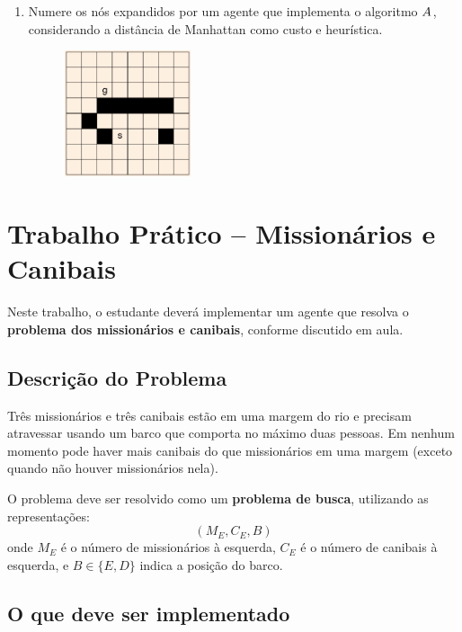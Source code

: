 \documentclass[9pt,a4paper]{extarticle}
\begin{document}
\begin{enumerate}
\begin{enumerate}[label*=\alph*)]
    \item Numere os nós expandidos por um agente que implementa o algoritmo \textbf{$A^{\*}$}, considerando a distância de Manhattan como custo e heurística.
    \begin{figure}[!ht]
      \centering
      \includegraphics[width=0.35\textwidth]{grid.png}
    \end{figure}
  \end{enumerate}

\end{enumerate}

\section{Trabalho Prático -- Missionários e Canibais}

Neste trabalho, o estudante deverá implementar um agente que resolva o \textbf{problema dos missionários e canibais}, conforme discutido em aula.

\subsection*{Descrição do Problema}

Três missionários e três canibais estão em uma margem do rio e precisam atravessar usando um barco que comporta no máximo duas pessoas.  
Em nenhum momento pode haver mais canibais do que missionários em uma margem (exceto quando não houver missionários nela).  

O problema deve ser resolvido como um \textbf{problema de busca}, utilizando as representações:
\[
(M_E, C_E, B)
\]
onde $M_E$ é o número de missionários à esquerda, $C_E$ é o número de canibais à esquerda, e $B \in \{E, D\}$ indica a posição do barco.

\subsection*{O que deve ser implementado}
\end{document}
